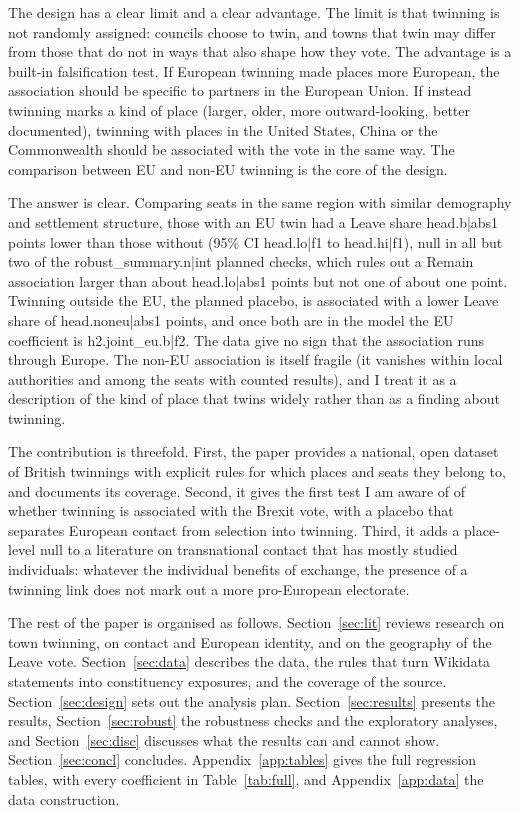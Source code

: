\documentclass[11pt,a4paper]{article}
\begin{document}
The design has a clear limit and a clear advantage. The limit is that twinning is not randomly assigned: councils choose to twin, and towns that twin may differ from those that do not in ways that also shape how they vote. The advantage is a built-in falsification test. If European twinning made places more European, the association should be specific to partners in the European Union. If instead twinning marks a kind of place (larger, older, more outward-looking, better documented), twinning with places in the United States, China or the Commonwealth should be associated with the vote in the same way. The comparison between EU and non-EU twinning is the core of the design.

The answer is clear. Comparing seats in the same region with similar demography and settlement structure, those with an EU twin had a Leave share {{head.b|abs1}} points lower than those without (95\% CI {{head.lo|f1}} to {{head.hi|f1}}), null in all but two of the {{robust_summary.n|int}} planned checks, which rules out a Remain association larger than about {{head.lo|abs1}} points but not one of about one point. Twinning outside the EU, the planned placebo, is associated with a lower Leave share of {{head.noneu|abs1}} points, and once both are in the model the EU coefficient is {{h2.joint_eu.b|f2}}. The data give no sign that the association runs through Europe. The non-EU association is itself fragile (it vanishes within local authorities and among the seats with counted results), and I treat it as a description of the kind of place that twins widely rather than as a finding about twinning.

The contribution is threefold. First, the paper provides a national, open dataset of British twinnings with explicit rules for which places and seats they belong to, and documents its coverage. Second, it gives the first test I am aware of of whether twinning is associated with the Brexit vote, with a placebo that separates European contact from selection into twinning. Third, it adds a place-level null to a literature on transnational contact that has mostly studied individuals: whatever the individual benefits of exchange, the presence of a twinning link does not mark out a more pro-European electorate.

The rest of the paper is organised as follows. Section~\ref{sec:lit} reviews research on town twinning, on contact and European identity, and on the geography of the Leave vote. Section~\ref{sec:data} describes the data, the rules that turn Wikidata statements into constituency exposures, and the coverage of the source. Section~\ref{sec:design} sets out the analysis plan. Section~\ref{sec:results} presents the results, Section~\ref{sec:robust} the robustness checks and the exploratory analyses, and Section~\ref{sec:disc} discusses what the results can and cannot show. Section~\ref{sec:concl} concludes. Appendix~\ref{app:tables} gives the full regression tables, with every coefficient in Table~\ref{tab:full}, and Appendix~\ref{app:data} the data construction.
\end{document}
